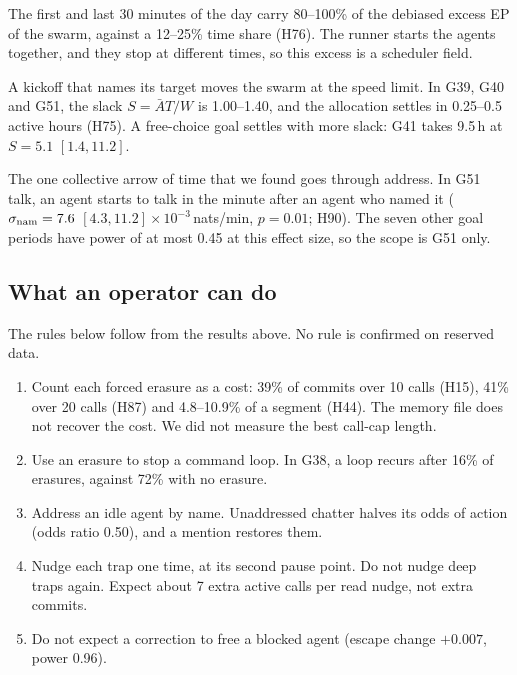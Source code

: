 The first and last 30 minutes of the day carry 80--100\% of the debiased excess EP of the swarm, against a 12--25\% time share (H76).
The runner starts the agents together, and they stop at different times, so this excess is a scheduler field.

A kickoff that names its target moves the swarm at the speed limit.
In G39, G40 and G51, the slack $S=\bar A T/W$ is 1.00--1.40, and the allocation settles in 0.25--0.5 active hours (H75).
A free-choice goal settles with more slack: G41 takes 9.5\,h at $S=5.1$ $[1.4, 11.2]$.

The one collective arrow of time that we found goes through address.
In G51 talk, an agent starts to talk in the minute after an agent who named it ($\sigma_{\rm nam}=7.6$ $[4.3, 11.2]\times10^{-3}$\,nats/min, $p=0.01$; H90).
The seven other goal periods have power of at most 0.45 at this effect size, so the scope is G51 only.

\subsection{What an operator can do}
\label{sec:info-operator}

The rules below follow from the results above. No rule is confirmed on reserved data.
\begin{enumerate}
\item Count each forced erasure as a cost: 39\% of commits over 10 calls (H15), 41\% over 20 calls (H87) and 4.8--10.9\% of a segment (H44). The memory file does not recover the cost. We did not measure the best call-cap length.
\item Use an erasure to stop a command loop. In G38, a loop recurs after 16\% of erasures, against 72\% with no erasure.
\item Address an idle agent by name. Unaddressed chatter halves its odds of action (odds ratio 0.50), and a mention restores them.
\item Nudge each trap one time, at its second pause point. Do not nudge deep traps again. Expect about 7 extra active calls per read nudge, not extra commits.
\item Do not expect a correction to free a blocked agent (escape change $+0.007$, power 0.96).
\end{enumerate}

